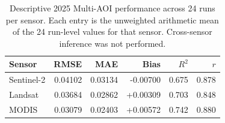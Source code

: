 \begin{table}[!t]\centering\footnotesize
\caption{Descriptive 2025 Multi-AOI performance across 24 runs per sensor. Each entry is the unweighted arithmetic mean of the 24 run-level values for that sensor. Cross-sensor inference was not performed.}\label{tab:multiaoi}
\begin{tabular}{lrrrrr}\toprule
Sensor & RMSE & MAE & Bias & $R^2$ & $r$ \\\midrule
Sentinel-2 & 0.04102 & 0.03134 & -0.00700 & 0.675 & 0.878 \\
Landsat & 0.03684 & 0.02862 & +0.00309 & 0.703 & 0.848 \\
MODIS & 0.03079 & 0.02403 & +0.00572 & 0.742 & 0.880 \\
\bottomrule\end{tabular}
\end{table}
